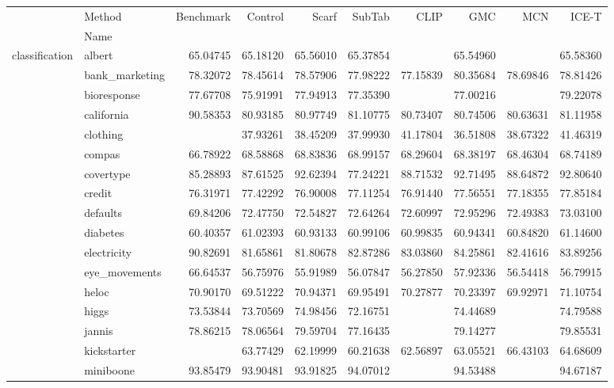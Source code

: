 \begin{tabular}{llrrrrrrrr}
\toprule
 & Method & Benchmark & Control & Scarf & SubTab & CLIP & GMC & MCN & ICE-T \\
 & Name &  &  &  &  &  &  &  &  \\
\midrule
\multirow[c]{21}{*}{classification} & albert & 65.04745 & 65.18120 & 65.56010 & 65.37854 &  & 65.54960 &  & 65.58360 \\
 & bank_marketing & 78.32072 & 78.45614 & 78.57906 & 77.98222 & 77.15839 & 80.35684 & 78.69846 & 78.81426 \\
 & bioresponse & 77.67708 & 75.91991 & 77.94913 & 77.35390 &  & 77.00216 &  & 79.22078 \\
 & california & 90.58353 & 80.93185 & 80.97749 & 81.10775 & 80.73407 & 80.74506 & 80.63631 & 81.11958 \\
 & clothing &  & 37.93261 & 38.45209 & 37.99930 & 41.17804 & 36.51808 & 38.67322 & 41.46319 \\
 & compas & 66.78922 & 68.58868 & 68.83836 & 68.99157 & 68.29604 & 68.38197 & 68.46304 & 68.74189 \\
 & covertype & 85.28893 & 87.61525 & 92.62394 & 77.24221 & 88.71532 & 92.71495 & 88.64872 & 92.80640 \\
 & credit & 76.31971 & 77.42292 & 76.90008 & 77.11254 & 76.91440 & 77.56551 & 77.18355 & 77.85184 \\
 & defaults & 69.84206 & 72.47750 & 72.54827 & 72.64264 & 72.60997 & 72.95296 & 72.49383 & 73.03100 \\
 & diabetes & 60.40357 & 61.02393 & 60.93133 & 60.99106 & 60.99835 & 60.94341 & 60.84820 & 61.14600 \\
 & electricity & 90.82691 & 81.65861 & 81.80678 & 82.87286 & 83.03860 & 84.25861 & 82.41616 & 83.89256 \\
 & eye_movements & 66.64537 & 56.75976 & 55.91989 & 56.07847 & 56.27850 & 57.92336 & 56.54418 & 56.79915 \\
 & heloc & 70.90170 & 69.51222 & 70.94371 & 69.95491 & 70.27877 & 70.23397 & 69.92971 & 71.10754 \\
 & higgs & 73.53844 & 73.70569 & 74.98456 & 72.16751 &  & 74.44689 &  & 74.79588 \\
 & jannis & 78.86215 & 78.06564 & 79.59704 & 77.16435 &  & 79.14277 &  & 79.85531 \\
 & kickstarter &  & 63.77429 & 62.19999 & 60.21638 & 62.56897 & 63.05521 & 66.43103 & 64.68609 \\
 & miniboone & 93.85479 & 93.90481 & 93.91825 & 94.07012 &  & 94.53488 &  & 94.67187 \\

\end{tabular}
